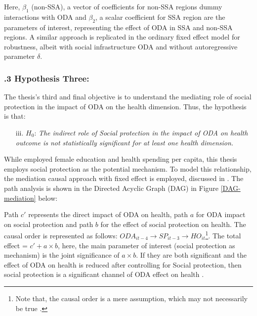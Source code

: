 Here, $\beta_1$ (non-SSA), a vector of coefficients for non-SSA regions dummy interactions with ODA and $\beta_2$, a scalar coefficient for SSA region are the parameters of interest, representing the effect of ODA in SSA and non-SSA regions. A similar approach is replicated in the ordinary fixed effect model for robustness, albeit with social infrastructure ODA and without autoregressive parameter $\delta$. 



\subsubsection*{.3  Hypothesis Three:}
The thesis's third and final objective is to understand the mediating role of social protection in the impact of ODA on the health dimension. Thus, the hypothesis is that:

\begin{itemize}
    \item[iii.] \(H_0\): \textit{The indirect role of Social protection in the impact of ODA on health outcome is not statistically significant for at least one health dimension.}
\end{itemize}

While \textcite{yogo_health_2015} employed female education and health spending per capita, this thesis employs social protection as the potential mechanism. To model this relationship, the mediation causal approach with fixed effect is employed, discussed in \textcite{hayes2009beyond, hicks2011causal, becker2023many}. The path analysis is shown in the Directed Acyclic Graph (DAG) in Figure \ref{DAG-mediation} below:  


Path $c'$ represents the direct impact of ODA on health, path $a$ for ODA impact on social protection and path $b$ for the effect of social protection on health. The causal order is represented as follows: \(ODA_{it-4} \rightarrow SP_{it-3} \rightarrow HO_{it}\)\footnote{Note that, the causal order is a mere assumption, which may not necessarily be true \parencite[see][]{yogo_health_2015}.}. The total effect = \(c' + a\times b \), here, the main parameter of interest (social protection as mechanism) is the joint significance of $a \times b$. If they are both significant and the effect of ODA on health is reduced after controlling for Social protection, then social protection is a significant channel of ODA effect on health \parencite[see][]{becker2023many, yogo_health_2015}. 



